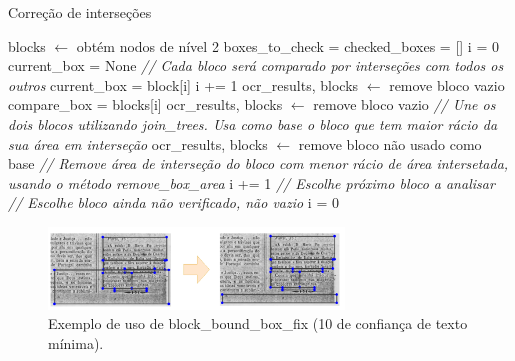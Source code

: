 \begin{breakablealgorithm}
	\caption{Correção de interseções}
	\begin{algorithmic}[1]

		\State blocks $\leftarrow$ obtém nodos de nível 2
		\State boxes\_to\_check = {}
		\State checked\_boxes = []
		\State i = 0
		\State current\_box = None
		\State \textit{// Cada bloco será comparado por interseções com todos os outros}
					\State current\_box = block[i]
					\State i += 1
				\Else
					\State ocr\_results, blocks $\leftarrow$ remove bloco vazio
				\EndIf
			\EndIf
				\State compare\_box = blocks[i]
					\State ocr\_results, blocks $\leftarrow$ remove bloco vazio
						\State \textit{// Une os dois blocos utilizando join\_trees. Usa como base o bloco que tem maior rácio da sua área em interseção}
						\State ocr\_results, blocks $\leftarrow$ remove bloco não usado como base
					\EndIf
				\Else
					\State \textit{// Remove área de interseção do bloco com menor rácio de área intersetada, usando o método remove\_box\_area}
				\EndIf
			\EndIf
			\State i += 1
				\State \textit{// Escolhe próximo bloco a analisar}
				\State  \State \textit{// Escolhe bloco ainda não verificado, não vazio}
					\State i = 0
				\EndIf
			\EndIf
		\EndWhile
	\end{algorithmic}
\end{breakablealgorithm}


\begin{figure}[H]
	\centering
	\includegraphics[width=0.7\textwidth]{images/ilustracoes/fix_bound_box_blocks.png}
	\caption{Exemplo de uso de block\_bound\_box\_fix (10 de confiança de texto mínima).}
	\label{fig:fix_bound_box_blocks}
\end{figure}



